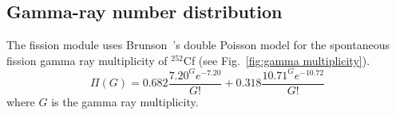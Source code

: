 \clearpage
\subsection{Gamma-ray number distribution}\label{sec:gamma-ray number distribution}

The fission module uses Brunson~\cite{Brunson 1982}'s double Poisson
model for the spontaneous fission gamma ray multiplicity of $^{252}$Cf
(see Fig.~\ref{fig:gamma multiplicity}).
%
\begin{equation}
\Pi(G)=0.682\frac{7.20^Ge^{-7.20}}{G!}+0.318\frac{10.71^Ge^{-10.72}}{G!}
\end{equation}
%
where $G$ is the gamma ray multiplicity.
\begin{figure}[ht]
\begin{center}

\end{center}
\end{figure}
